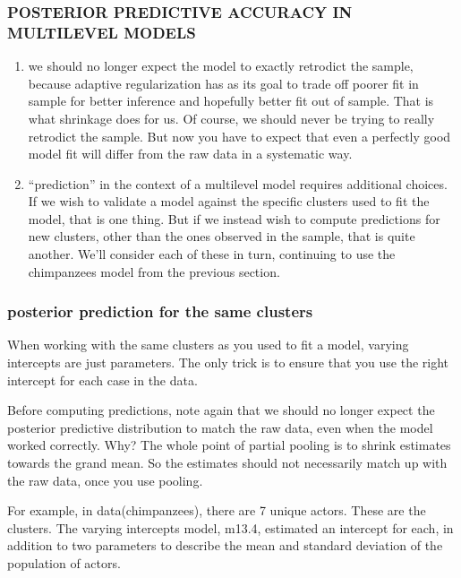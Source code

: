 \documentclass[
]{article}
\begin{document}
\hypertarget{posterior-predictive-accuracy-in-multilevel-models}{%
\subsubsection{POSTERIOR PREDICTIVE ACCURACY IN MULTILEVEL
MODELS}\label{posterior-predictive-accuracy-in-multilevel-models}}

\begin{enumerate}
\def\labelenumi{\arabic{enumi})}
\item
  we should no longer expect the model to exactly retrodict the sample,
  because adaptive regularization has as its goal to trade off poorer
  fit in sample for better inference and hopefully better fit out of
  sample. That is what shrinkage does for us. Of course, we should never
  be trying to really retrodict the sample. But now you have to expect
  that even a perfectly good model fit will differ from the raw data in
  a systematic way.
\item
  ``prediction'' in the context of a multilevel model requires
  additional choices. If we wish to validate a model against the
  specific clusters used to fit the model, that is one thing. But if we
  instead wish to compute predictions for new clusters, other than the
  ones observed in the sample, that is quite another. We'll consider
  each of these in turn, continuing to use the chimpanzees model from
  the previous section.
\end{enumerate}

\hypertarget{posterior-prediction-for-the-same-clusters}{%
\subsubsection{posterior prediction for the same
clusters}\label{posterior-prediction-for-the-same-clusters}}

When working with the same clusters as you used to fit a model, varying
intercepts are just parameters. The only trick is to ensure that you use
the right intercept for each case in the data.

Before computing predictions, note again that we should no longer expect
the posterior predictive distribution to match the raw data, even when
the model worked correctly. Why? The whole point of partial pooling is
to shrink estimates towards the grand mean. So the estimates should not
necessarily match up with the raw data, once you use pooling.

For example, in data(chimpanzees), there are 7 unique actors. These are
the clusters. The varying intercepts model, m13.4, estimated an
intercept for each, in addition to two parameters to describe the mean
and standard deviation of the population of actors.
\end{document}
